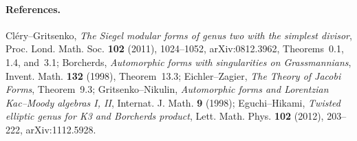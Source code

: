 \paragraph{References.}
Cl\'ery--Gritsenko, \emph{The Siegel modular forms of genus two with the
simplest divisor}, Proc. Lond. Math. Soc. \textbf{102} (2011),
1024--1052, arXiv:0812.3962, Theorems~0.1, 1.4, and~3.1;
Borcherds, \emph{Automorphic forms with singularities on Grassmannians},
Invent. Math. \textbf{132} (1998), Theorem~13.3; Eichler--Zagier,
\emph{The Theory of Jacobi Forms}, Theorem~9.3; Gritsenko--Nikulin,
\emph{Automorphic forms and Lorentzian Kac--Moody algebras I, II},
Internat. J. Math. \textbf{9} (1998); Eguchi--Hikami,
\emph{Twisted elliptic genus for K3 and Borcherds product}, Lett. Math.
Phys. \textbf{102} (2012), 203--222, arXiv:1112.5928.
